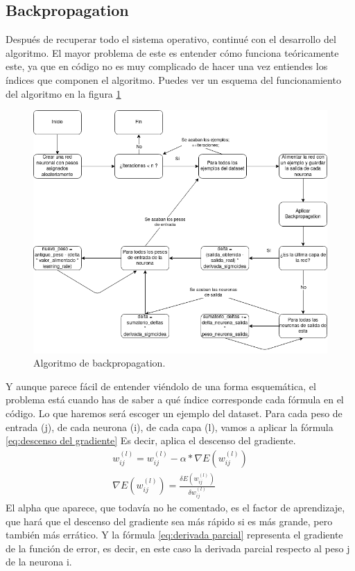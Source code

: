 \subsection{Backpropagation}
Después de recuperar todo el sistema operativo, continué con el desarrollo del algoritmo. El mayor problema de este es entender cómo funciona teóricamente este, ya que en código no es muy complicado de hacer una vez entiendes los índices que componen el algoritmo. Puedes ver un esquema  del funcionamiento del algoritmo en la figura \ref{Algoritmo de backpropagation}
\begin{figure}[h]
	\centering
	\includegraphics[width=15cm]{archivos/imagenes/Algoritmo-de-backpropagation.png}
	\caption{Algoritmo de backpropagation.}
	\label{Algoritmo de backpropagation}
\end{figure}

Y aunque parece fácil de entender viéndolo de una forma esquemática, el problema está cuando has de saber a qué índice corresponde cada fórmula en el código. Lo que haremos será escoger un ejemplo del dataset. Para cada peso de entrada (j), de cada neurona (i), de cada capa (l), vamos a aplicar la fórmula \ref{eq:descenso del gradiente} Es decir, aplica el descenso del gradiente.
\begin{subequations}
	\begin{eqnarray}
		w_{ij}^{(l)} = w_{ij}^{(l)} - \alpha*\nabla E(w_{ij}^{(l)}) \label{eq:descenso del gradiente} \\
		\nabla E(w_{ij}^{(l)}) =  \frac{\delta E(w_{ij}^{(l)})}{\delta w_{ij}^{(l)}} \label{eq:derivada parcial}
	\end{eqnarray}
\end{subequations}
El alpha que aparece, que todavía no he comentado, es el factor de aprendizaje, que hará que el descenso del gradiente sea más rápido si es más grande, pero también más errático. Y la fórmula \ref{eq:derivada parcial} representa el gradiente de la función de error, es decir, en este caso la derivada parcial respecto al peso j de la neurona i.

